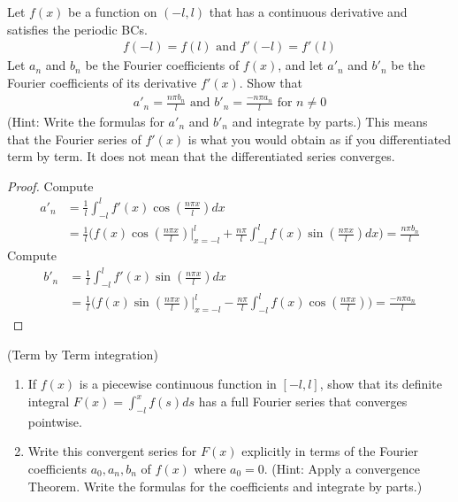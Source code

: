 \documentclass{report}
\begin{document}
\begin{question}{}{}
Let $f(x)$ be a function on $(-l,l)$ that has a continuous derivative and satisfies the periodic BCs. 
\begin{align*}
f(-l)=f(l)\text{ and }f'(-l)=f'(l)
\end{align*}
Let $a_n$ and  $b_n$ be the Fourier coefficients of $f(x)$, and let $a'_n$ and  $b'_n$ be the Fourier coefficients of its derivative $f'(x)$. Show that 
\begin{align*}
a'_n= \frac{n \pi  b_n}{l}\text{ and }b'_n = \frac{- n \pi  a_n}{l}\text{ for }n\neq 0
\end{align*}
(Hint: Write the formulas for $a'_n$ and $b'_n$ and integrate by parts.) This means that the Fourier series of $f'(x)$ is what you would obtain as if you differentiated term by term. It does not mean that the differentiated series converges. 
\end{question}
\begin{proof}
Compute 
\begin{align*}
a'_n&= \frac{1}{l}\int_{-l}^{l}f'(x) \cos (\frac{n \pi  x}{l})dx  \\
&=\frac{1}{l} \Big( f(x) \cos (\frac{n \pi  x}{l})\Big|_{x=-l}^{l}+ \frac{n \pi }{l} \int_{-l}^l f(x)\sin ( \frac{n \pi  x}{l})dx \Big)= \frac{n \pi  b_n}{l}
\end{align*}
Compute 
\begin{align*}
b'_n&= \frac{1}{l}\int_{-l}^l f'(x) \sin ( \frac{n \pi  x}{l})dx \\
&=\frac{1}{l}\Big( f(x)\sin ( \frac{n \pi  x}{l})\Big|_{x=-l}^l - \frac{n \pi }{l}\int_{-l}^l f(x) \cos ( \frac{n \pi  x}{l}) \Big)= \frac{-n \pi  a_n}{l}
\end{align*}
\end{proof}
\begin{question}{}{}
  (Term by Term integration) 
\begin{enumerate}[label=(\alph*)]
  \item If $f(x)$ is a piecewise continuous function in $[-l,l]$, show that its definite integral $F(x)=\int_{-l}^x f(s)ds$ has a full Fourier series that converges pointwise. 
  \item Write this convergent series for $F(x)$ explicitly in terms of the Fourier coefficients $a_0,a_n,b_n$ of  $f(x)$ where $a_0=0$. (Hint: Apply a convergence Theorem. Write the formulas for the coefficients and integrate by parts.)
\end{enumerate}
\end{question}
\end{document}
